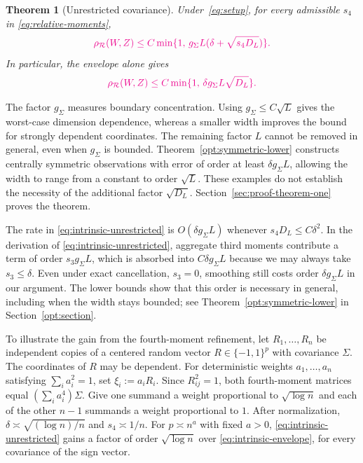 \documentclass[11pt,letterpaper]{article}
\newenvironment{recovered}{}{}
\newcommand{\vSix}[1]{{\color{magenta}#1}}
\newenvironment{vSixBlock}{\color{magenta}}{}
\newtheorem{theorem}{Theorem}
\theoremstyle{remark}
\newcommand{\rh}{\rho_{\mathcal R}}
\begin{document}
\begin{theorem}[Unrestricted covariance]\label{thm:unrestricted}
\vSix{Under~\eqref{eq:setup}, for every admissible $s_4$ in \eqref{eq:relative-moments},}
\begin{equation}\label{eq:intrinsic-unrestricted}
\vSix{\rh(W,Z)\le C\min\{1,\,g_\Sigma L(\delta+\sqrt{s_4D_L})\}.}
\end{equation}
\vSix{In particular, the envelope alone gives}
\begin{equation}\label{eq:intrinsic-envelope}
\vSix{\rh(W,Z)\le C\min\{1,\,\delta g_\Sigma L\sqrt{D_L}\}.}
\end{equation}
\end{theorem}
\begin{vSixBlock}
The factor \(g_\Sigma\) measures boundary concentration. Using
\(g_\Sigma\le C\sqrt L\) gives the worst-case dimension dependence,
whereas a smaller width improves the bound for strongly dependent
coordinates. The remaining factor \(L\) cannot be removed in general,
even when \(g_\Sigma\) is bounded. Theorem~\ref{opt:symmetric-lower}
constructs centrally symmetric observations with error of order at
least \(\delta g_\Sigma L\), allowing the width to range from a
constant to order \(\sqrt L\). These examples do not establish
the necessity of the additional factor \(\sqrt{D_L}\).
Section~\ref{sec:proof-theorem-one} proves the theorem.
\end{vSixBlock}

\begin{recovered}
The rate in \eqref{eq:intrinsic-unrestricted} is \(O(\delta g_\Sigma L)\)
whenever \({s_4D_L\le C\delta^2}\). In the derivation of
\eqref{eq:intrinsic-unrestricted}, aggregate third moments contribute a
term of order \(s_3g_\Sigma L\), which is absorbed into
\(C\delta g_\Sigma L\) because we may always take \(s_3\le\delta\).
Even under exact cancellation, \(s_3=0\), smoothing still costs order
\(\delta g_\Sigma L\) in our argument. \vSix{The lower bounds show
that this order is necessary in general, including when the width
stays bounded;} see
Theorem~\ref{opt:symmetric-lower} in Section~\ref{opt:section}.
\end{recovered}

{To illustrate the gain from the fourth-moment
refinement, let \(R_1,\ldots,R_n\) be independent copies of a centered
random vector \(R\in\{-1,1\}^p\) with covariance \(\Sigma\). The
coordinates of \(R\) may be dependent. For deterministic weights
\(a_1,\ldots,a_n\) satisfying \(\sum_i a_i^2=1\), set
\(\xi_i:=a_iR_i\).} Since $R_{ij}^2=1$, both fourth-moment matrices equal $(\sum_i a_i^4)\Sigma$. {Give one summand a weight proportional to $\sqrt{\log n}$ and each of the other $n-1$ summands a weight proportional to $1$.} After normalization, $\delta\asymp\sqrt{(\log n)/n}$ and $s_4\asymp1/n$. For $p\asymp n^a$ with fixed $a>0$, \eqref{eq:intrinsic-unrestricted} gains a factor of order $\sqrt{\log n}$ over \eqref{eq:intrinsic-envelope}, for every covariance of the sign vector.
\end{document}
